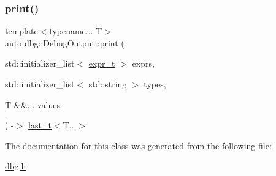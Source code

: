 \subsubsection{\texorpdfstring{print()}{print()}}
{\footnotesize\ttfamily template$<$typename... T$>$ \\
auto dbg\+::\+Debug\+Output\+::print (\begin{DoxyParamCaption}\item[{std\+::initializer\+\_\+list$<$ \hyperlink{classdbg_1_1DebugOutput_a5d9b38d5b9276cb584c0e20e9b1a2045}{expr\+\_\+t} $>$}]{exprs,  }\item[{std\+::initializer\+\_\+list$<$ std\+::string $>$}]{types,  }\item[{T \&\&...}]{values }\end{DoxyParamCaption}) -\/$>$ \hyperlink{namespacedbg_a4754c7365d6eb31696a4613230e21ac4}{last\+\_\+t}$<$T...$>$ \hspace{0.3cm}{\ttfamily [inline]}}



The documentation for this class was generated from the following file\+:\begin{DoxyCompactItemize}
\item 
\hyperlink{dbg_8h}{dbg.\+h}\end{DoxyCompactItemize}
